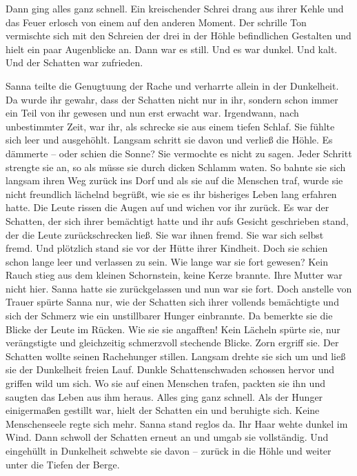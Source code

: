 \documentclass[10pt, a4paper, oneside]{book}
\begin{document}
\begin{multicols}{2}
Dann ging alles ganz schnell. Ein kreischender Schrei drang aus ihrer Kehle und das Feuer erlosch von einem auf den anderen Moment. Der schrille Ton vermischte sich mit den Schreien der drei in der Höhle befindlichen Gestalten und hielt ein paar Augenblicke an. Dann war es still. Und es war dunkel. Und kalt. Und der Schatten war zufrieden.\bigskip

Sanna teilte die Genugtuung der Rache und verharrte allein in der Dunkelheit. Da wurde ihr gewahr, dass der Schatten nicht nur in ihr, sondern schon immer ein Teil von ihr gewesen und nun erst erwacht war. Irgendwann, nach unbestimmter Zeit, war ihr, als schrecke sie aus einem tiefen Schlaf. Sie fühlte sich leer und ausgehöhlt. Langsam schritt sie davon und verließ die Höhle. Es dämmerte – oder schien die Sonne? Sie vermochte es nicht zu sagen. Jeder Schritt strengte sie an, so als müsse sie durch dicken Schlamm waten. So bahnte sie sich langsam ihren Weg zurück ins Dorf und als sie auf die Menschen traf, wurde sie nicht freundlich lächelnd begrüßt, wie sie es ihr bisheriges Leben lang erfahren hatte. Die Leute rissen die Augen auf und wichen vor ihr zurück. Es war der Schatten, der sich ihrer bemächtigt hatte und ihr aufs Gesicht geschrieben stand, der die Leute zurückschrecken ließ. Sie war ihnen fremd. Sie war sich selbst fremd. Und plötzlich stand sie vor der Hütte ihrer Kindheit. Doch sie schien schon lange leer und verlassen zu sein. Wie lange war sie fort gewesen? Kein Rauch stieg aus dem kleinen Schornstein, keine Kerze brannte. Ihre Mutter war nicht hier. Sanna hatte sie zurückgelassen und nun war sie fort. Doch anstelle von Trauer spürte Sanna nur, wie der Schatten sich ihrer vollends bemächtigte und sich der Schmerz wie ein unstillbarer Hunger einbrannte. Da bemerkte sie die Blicke der Leute im Rücken. Wie sie sie angafften! Kein Lächeln spürte sie, nur verängstigte und gleichzeitig schmerzvoll stechende Blicke. Zorn ergriff sie. Der Schatten wollte seinen Rachehunger stillen. Langsam drehte sie sich um und ließ sie der Dunkelheit freien Lauf. Dunkle Schattenschwaden schossen hervor und griffen wild um sich. Wo sie auf einen Menschen trafen, packten sie ihn und saugten das Leben aus ihm heraus. Alles ging ganz schnell. Als der Hunger einigermaßen gestillt war, hielt der Schatten ein und beruhigte sich. Keine Menschenseele regte sich mehr. Sanna stand reglos da. Ihr Haar wehte dunkel im Wind. Dann schwoll der Schatten erneut an und umgab sie vollständig. Und eingehüllt in Dunkelheit schwebte sie davon – zurück in die Höhle und weiter unter die Tiefen der Berge.


\end{multicols}
\end{document}
